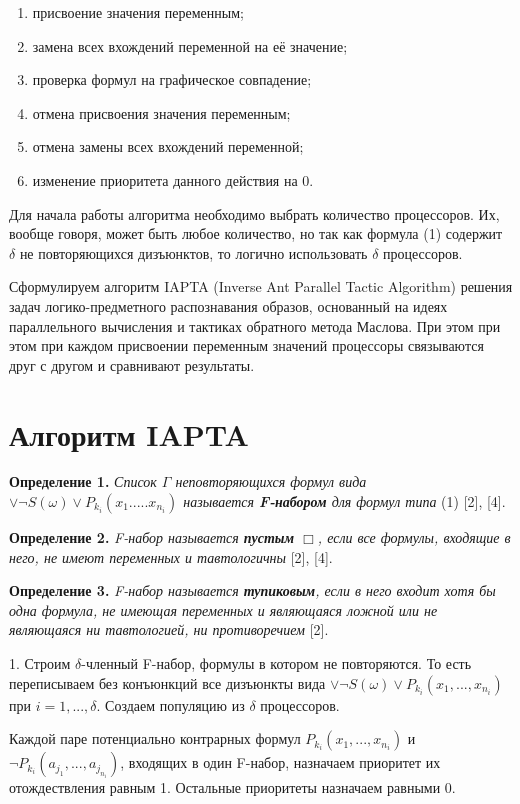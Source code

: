 \documentclass{spisok-article}
\begin{document}
  \begin{enumerate}
  \item
    присвоение значения переменным;
  \item
    замена всех вхождений переменной на её значение;
  \item
    проверка формул на графическое совпадение;
  \item
    отмена присвоения значения переменным;
  \item
    отмена замены всех вхождений переменной;
  \item
    изменение приоритета данного действия на 0.
  \end{enumerate}

Для начала работы алгоритма необходимо выбрать количество процессоров. Их, вообще говоря, может быть любое количество, но так как формула (1) содержит $\delta$ не повторяющихся дизъюнктов, то логично использовать $\delta$ процессоров.


Сформулируем алгоритм IAPTA (Inverse Ant Parallel Tactic Algorithm) решения задач логико-предметного распознавания образов, основанный на идеях параллельного вычисления и тактиках обратного метода Маслова. При этом при этом при каждом присвоении переменным значений процессоры связываются друг с другом и сравнивают результаты.


\section{Алгоритм IAPTA}


{\bf Определение 1.}  {\it Список $\Gamma$ неповторяющихся формул вида $\lor\lnot S(\omega) \lor P_{k_i}( x_1. .... x_{n_i})$  называется {\bf F-набором} для формул типа }(1) [2], [4].

{\bf Определение 2.}  {\it F-набор называется {\bf пустым} $\Box$, если все формулы, входящие в него, не имеют переменных и тавтологичны }[2], [4].

{\bf Определение 3.}  {\it F-набор  называется {\bf тупиковым}, если в него входит хотя бы одна формула, не имеющая переменных и являющаяся ложной или не являющаяся ни тавтологией, ни противоречием  }[2].



1.  Строим $\delta$-членный F-набор, формулы в котором не повторяются. То есть переписываем без конъюнкций все дизъюнкты вида $\lor\lnot S(\omega) \lor P_{k_i}( x_1, ..., x_{n_i})$ при $i=1,...,\delta$. Создаем популяцию из $\delta$ процессоров.

Каждой паре потенциально контрарных формул $P_{k_i}( x_1, ..., x_{n_i})$ и $\lnot P_{k_i}( a_{j_1}, ..., a_{j_{n_i}})$, входящих в один F-набор, назначаем приоритет их отождествления  равным 1. Остальные приоритеты назначаем равными 0.\
\end{document}
